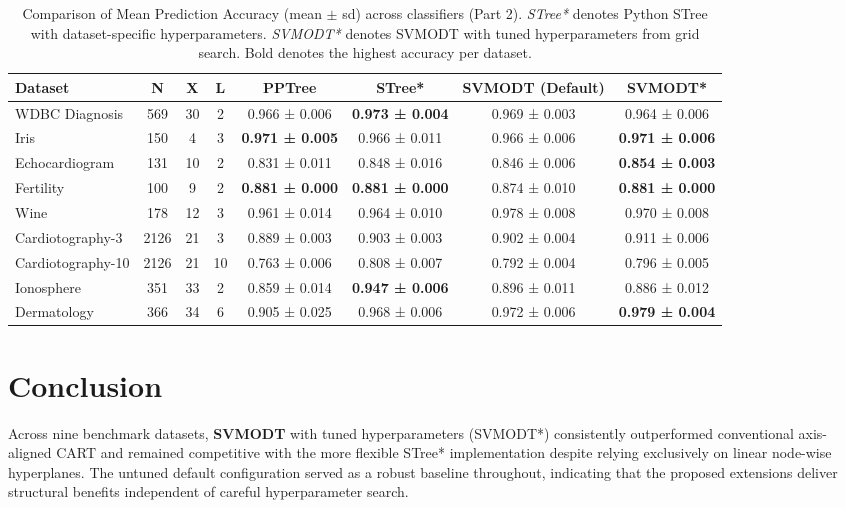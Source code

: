 \begin{table}
\centering
\caption{\label{tab:tbl-benchmark-model-latex-b}Comparison of Mean Prediction Accuracy (mean \(\pm\) sd) across classifiers (Part 2). \textit{STree*} denotes Python STree with dataset-specific hyperparameters. \textit{SVMODT*} denotes SVMODT with tuned hyperparameters from grid search. Bold denotes the highest accuracy per dataset.}
\centering
\fontsize{6}{8}\selectfont
\begin{tabular}[t]{l|c|c|c|c|c|c|c}
\hline
Dataset & N & X & L & PPTree & STree* & SVMODT (Default) & SVMODT*\\
\hline
WDBC Diagnosis & 569 & 30 & 2 & 0.966 ± 0.006 & \textbf{0.973 ± 0.004} & 0.969 ± 0.003 & 0.964 ± 0.006\\
\hline
Iris & 150 & 4 & 3 & \textbf{0.971 ± 0.005} & 0.966 ± 0.011 & 0.966 ± 0.006 & \textbf{0.971 ± 0.006}\\
\hline
Echocardiogram & 131 & 10 & 2 & 0.831 ± 0.011 & 0.848 ± 0.016 & 0.846 ± 0.006 & \textbf{0.854 ± 0.003}\\
\hline
Fertility & 100 & 9 & 2 & \textbf{0.881 ± 0.000} & \textbf{0.881 ± 0.000} & 0.874 ± 0.010 & \textbf{0.881 ± 0.000}\\
\hline
Wine & 178 & 12 & 3 & 0.961 ± 0.014 & 0.964 ± 0.010 & 0.978 ± 0.008 & 0.970 ± 0.008\\
\hline
Cardiotography-3 & 2126 & 21 & 3 & 0.889 ± 0.003 & 0.903 ± 0.003 & 0.902 ± 0.004 & 0.911 ± 0.006\\
\hline
Cardiotography-10 & 2126 & 21 & 10 & 0.763 ± 0.006 & 0.808 ± 0.007 & 0.792 ± 0.004 & 0.796 ± 0.005\\
\hline
Ionosphere & 351 & 33 & 2 & 0.859 ± 0.014 & \textbf{0.947 ± 0.006} & 0.896 ± 0.011 & 0.886 ± 0.012\\
\hline
Dermatology & 366 & 34 & 6 & 0.905 ± 0.025 & 0.968 ± 0.006 & 0.972 ± 0.006 & \textbf{0.979 ± 0.004}\\
\hline
\end{tabular}
\end{table}

\section{Conclusion}\label{conclusion}

Across nine benchmark datasets, \textbf{SVMODT} with tuned hyperparameters (SVMODT*) consistently outperformed conventional axis-aligned CART and remained competitive with the more flexible STree* implementation despite relying exclusively on linear node-wise hyperplanes. The untuned default configuration served as a robust baseline throughout, indicating that the proposed extensions deliver structural benefits independent of careful hyperparameter search.

